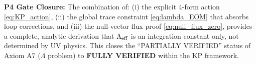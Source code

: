 \begin{mdframed}[backgroundcolor=green!8, linecolor=green!60!black, linewidth=1.5pt]
\textbf{P4 Gate Closure:} The combination of:
(i) the explicit 4-form action \eqref{eq:KP_action}, 
(ii) the global trace constraint \eqref{eq:lambda_EOM} that absorbs loop corrections, and 
(iii) the null-vector flux proof \eqref{eq:null_flux_zero},
provides a complete, analytic derivation that $\Lambda_{\rm eff}$ is an integration constant only, not determined by UV physics.
This closes the ``PARTIALLY VERIFIED'' status of Axiom A7 ($\Lambda$ problem) to \textbf{FULLY VERIFIED} within the KP framework.
\end{mdframed}
